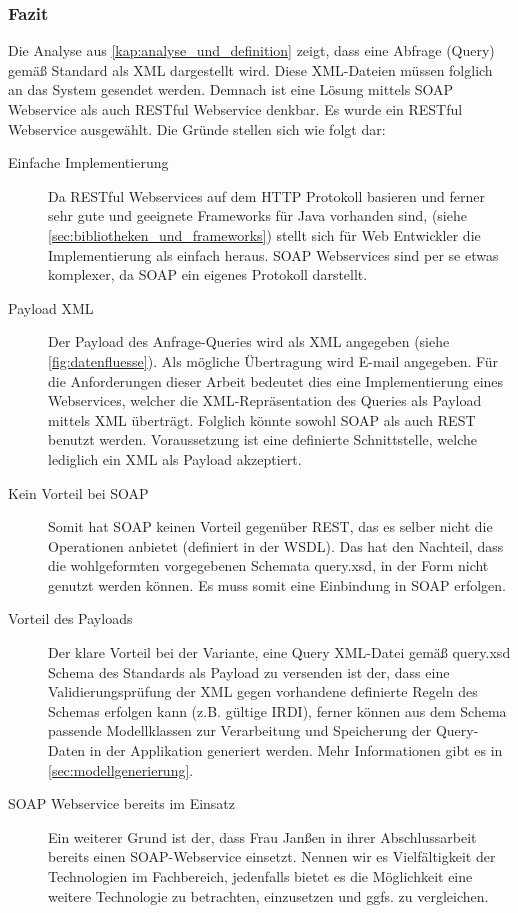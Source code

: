 \subsubsection{Fazit}
Die Analyse aus \autoref{kap:analyse_und_definition} zeigt, dass eine Abfrage (Query) gemäß Standard als XML dargestellt wird. Diese XML-Dateien müssen folglich an das System gesendet werden. Demnach ist eine Lösung mittels \gls{SOAP} \gls{Webservice} als auch \gls{REST}ful \gls{Webservice} denkbar. 
Es wurde ein \gls{REST}ful \gls{Webservice} ausgewählt. Die Gründe stellen sich wie folgt dar:

\begin{description}
\item[Einfache Implementierung] Da \gls{REST}ful Webservices auf dem \gls{HTTP} Protokoll basieren und ferner sehr gute und geeignete Frameworks für Java vorhanden sind, (siehe \autoref{sec:bibliotheken_und_frameworks}) stellt sich für Web Entwickler die Implementierung als einfach heraus. \gls{SOAP} \glspl{Webservice} sind per se etwas komplexer, da \gls{SOAP} ein eigenes Protokoll darstellt. 
\item[Payload XML] Der Payload des Anfrage-Queries wird als XML angegeben (siehe \autoref{fig:datenfluesse}). Als mögliche Übertragung wird E-mail angegeben. Für die Anforderungen dieser Arbeit bedeutet dies eine Implementierung eines \glspl{Webservice}, welcher die XML-Repräsentation des Queries als Payload mittels XML überträgt. Folglich könnte sowohl \gls{SOAP} als auch \gls{REST} benutzt werden. Voraussetzung ist eine definierte Schnittstelle, welche lediglich ein XML als Payload akzeptiert. 
\item[Kein Vorteil bei SOAP] Somit hat \gls{SOAP} keinen Vorteil gegenüber \gls{REST}, das es selber nicht die Operationen anbietet (definiert in der \gls{WSDL}). Das hat den Nachteil, dass die wohlgeformten vorgegebenen Schemata query.xsd, in der Form nicht genutzt werden können. Es muss somit eine Einbindung in \gls{SOAP} erfolgen.
 \item[Vorteil des Payloads] Der klare Vorteil bei der Variante, eine Query XML-Datei gemäß query.xsd Schema des Standards als Payload zu versenden ist der, dass eine Validierungsprüfung der XML gegen vorhandene definierte Regeln des Schemas erfolgen kann (z.B. gültige \gls{IRDI}), ferner können aus dem Schema passende Modellklassen zur Verarbeitung und Speicherung der Query-Daten in der Applikation generiert werden. Mehr Informationen gibt es in \autoref{sec:modellgenerierung}. 
\item[SOAP Webservice bereits im Einsatz] Ein weiterer Grund ist der, dass Frau Janßen in ihrer Abschlussarbeit bereits einen SOAP-Webservice einsetzt. Nennen wir es Vielfältigkeit der Technologien im Fachbereich, jedenfalls bietet es die Möglichkeit eine weitere Technologie zu betrachten, einzusetzen und ggfs. zu vergleichen. 
\end{description}

